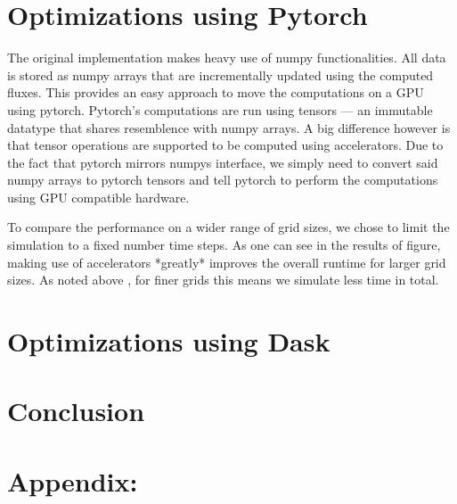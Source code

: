 \documentclass[a4paper,12pt]{article}
\begin{document}
\section{Optimizations using Pytorch}
The original implementation makes heavy use of numpy functionalities.
All data is stored as numpy arrays that are incrementally updated using the computed fluxes.
This provides an easy approach to move the computations on a GPU using pytorch.
Pytorch's computations are run using tensors --- an immutable datatype that shares resemblence with numpy arrays.
A big difference however is that tensor operations are supported to be computed using accelerators.
Due to the fact that pytorch mirrors numpys interface, we simply need to convert said numpy arrays to pytorch tensors
and tell pytorch to perform the computations using GPU compatible hardware.

To compare the performance on a wider range of grid sizes, we chose to limit the simulation to a fixed number time steps.
As one can see in the results of figure, making use of accelerators *greatly* improves the overall runtime for larger grid sizes.
As noted above , for finer grids this means we simulate less time in total.

\section{Optimizations using Dask}

\section{Conclusion}
\section{Appendix:}


\end{document}
